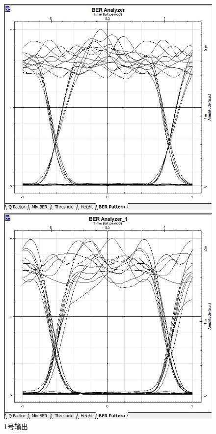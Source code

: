 \documentclass[12pt, a4paper, oneside]{article}
\begin{document}
\begin{spacing}{2.0}
\begin{figure}[H]
  \begin{minipage}[t]{0.5\linewidth}
      \centering
      \includegraphics[scale=0.5]{1-BER.jpg}
      \caption{1号输出}
      \label{fig:side:a}
    \end{minipage}%
    \begin{minipage}[t]{0.5\linewidth}
      \centering
      \includegraphics[scale=0.5]{2-BER.jpg}

\end{minipage}
\end{figure}
\end{spacing}
\end{document}
